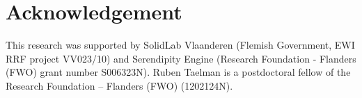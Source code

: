 \section{Acknowledgement}

This research was supported by SolidLab Vlaanderen (Flemish Government, EWI RRF project VV023/10) and Serendipity Engine (Research Foundation - Flanders (FWO) grant number S006323N).
Ruben Taelman is a postdoctoral fellow of the Research Foundation – Flanders (FWO) (1202124N).
